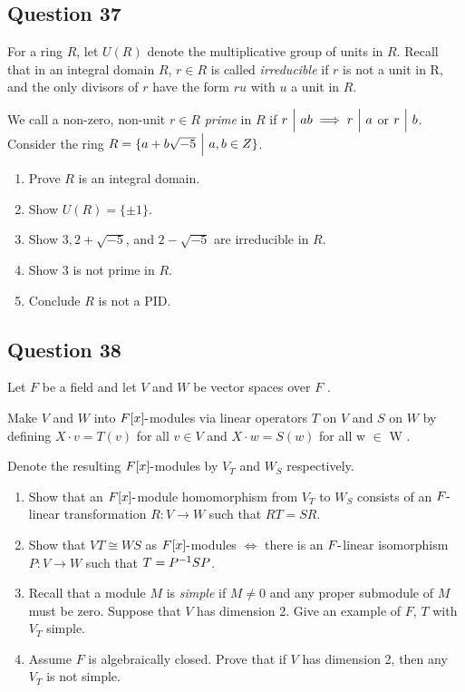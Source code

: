 \documentclass[12pt]{article}
\begin{document}
\hypertarget{question-37}{%
\subsection{Question 37}\label{question-37}}

For a ring \(R\), let \(U(R)\) denote the multiplicative group of units
in \(R\). Recall that in an integral domain \(R\), \(r \in R\) is called
\emph{irreducible} if \(r\) is not a unit in R, and the only divisors of
\(r\) have the form \(ru\) with \(u\) a unit in \(R\).

We call a non-zero, non-unit \(r \in R\) \emph{prime} in \(R\) if
\(r {~\Bigm|~} ab \implies r {~\Bigm|~} a\) or \(r {~\Bigm|~} b\). Consider
the ring \(R = \{a + b \sqrt{-5}{~\mathrel{\Big|}~} a, b \in Z\}\).

\begin{enumerate}
\def\labelenumi{(\alph{enumi})}
\item
  Prove \(R\) is an integral domain.
\item
  Show \(U(R) = \{\pm1\}\).
\item
  Show \(3, 2 + \sqrt{-5}\), and \(2 - \sqrt{-5}\) are irreducible in
  \(R\).
\item
  Show 3 is not prime in \(R\).
\item
  Conclude \(R\) is not a PID.
\end{enumerate}

\hypertarget{question-38}{%
\subsection{Question 38}\label{question-38}}

Let \(F\) be a field and let \(V\) and \(W\) be vector spaces over \(F\)
.

Make \(V\) and \(W\) into \(F[x]{\hbox{-}}\)modules via linear operators
\(T\) on \(V\) and \(S\) on \(W\) by defining \(X \cdot v = T (v)\) for
all \(v \in V\) and \(X \cdot w = S(w)\) for all w \(\in\) W .

Denote the resulting \(F[x]{\hbox{-}}\)modules by \(V_T\) and \(W_S\)
respectively.

\begin{enumerate}
\def\labelenumi{(\alph{enumi})}
\item
  Show that an \(F[x]{\hbox{-}}\)module homomorphism from \(V_T\) to \(W_S\)
  consists of an \(F{\hbox{-}}\)linear transformation \(R : V \to W\) such
  that \(RT = SR\).
\item
  Show that \(VT \cong WS\) as \(F[x]{\hbox{-}}\)modules \(\iff\) there is an
  \(F{\hbox{-}}\)linear isomorphism \(P : V \to W\) such that
  \(T = P^{-1} SP\).
\item
  Recall that a module \(M\) is \emph{simple} if \(M \neq 0\) and any
  proper submodule of \(M\) must be zero. Suppose that \(V\) has
  dimension 2. Give an example of \(F\), \(T\) with \(V_T\) simple.
\item
  Assume \(F\) is algebraically closed. Prove that if \(V\) has
  dimension 2, then any \(V_T\) is not simple.
\end{enumerate}
\end{document}
